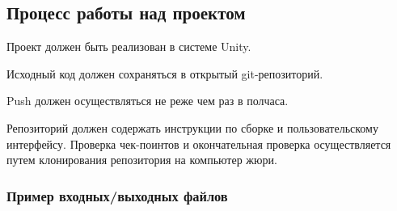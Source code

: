



\subsection*{Процесс работы над проектом}

Проект должен быть реализован в системе Unity.

Исходный код должен сохраняться в открытый git-репозиторий.

Push должен осуществляться не реже чем раз в полчаса.

Репозиторий должен содержать инструкции по сборке и пользовательскому интерфейсу. Проверка чек-поинтов и окончательная проверка осуществляется путем клонирования репозитория на компьютер жюри.


\subsubsection*{Пример входных/выходных файлов}


